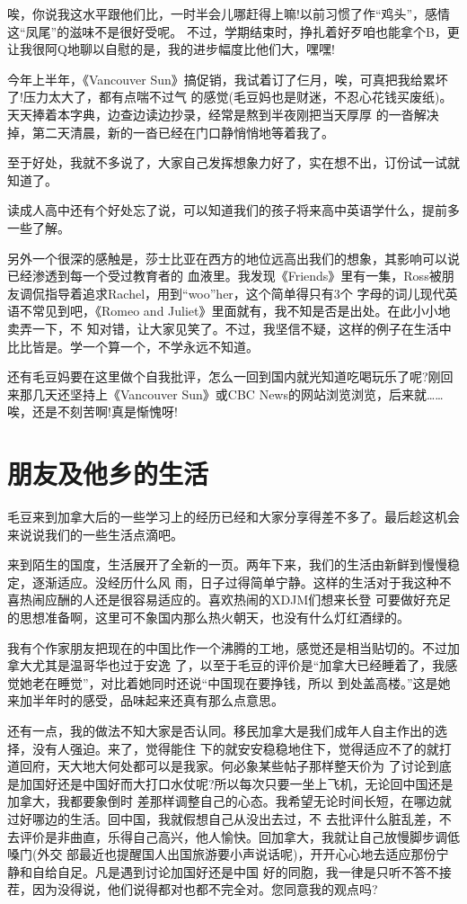 \documentclass[11pt,a4paper,onecolumn]{article}
\begin{document}
唉，你说我这水平跟他们比，一时半会儿哪赶得上嘛!以前习惯了作``鸡头''，感情这``凤尾''的滋味不是很好受呢。
不过，学期结束时，挣扎着好歹咱也能拿个B，更让我很阿Q地聊以自慰的是，我的进步幅度比他们大，嘿嘿!


今年上半年，《Vancouver Sun》搞促销，我试着订了仨月，唉，可真把我给累坏了!压力太大了，都有点喘不过气
的感觉(毛豆妈也是财迷，不忍心花钱买废纸)。天天捧着本字典，边查边读边抄录，经常是熬到半夜刚把当天厚厚
的一沓解决掉，第二天清晨，新的一沓已经在门口静悄悄地等着我了。


至于好处，我就不多说了，大家自己发挥想象力好了，实在想不出，订份试一试就知道了。


读成人高中还有个好处忘了说，可以知道我们的孩子将来高中英语学什么，提前多一些了解。


另外一个很深的感触是，莎士比亚在西方的地位远高出我们的想象，其影响可以说已经渗透到每一个受过教育者的
血液里。我发现《Friends》里有一集，Ross被朋友调侃指导着追求Rachel，用到``woo''her，这个简单得只有3个
字母的词儿现代英语不常见到吧，《Romeo and Juliet》里面就有，我不知是否是出处。在此小小地卖弄一下，不
知对错，让大家见笑了。不过，我坚信不疑，这样的例子在生活中比比皆是。学一个算一个，不学永远不知道。


还有毛豆妈要在这里做个自我批评，怎么一回到国内就光知道吃喝玩乐了呢?刚回来那几天还坚持上《Vancouver
Sun》或CBC News的网站浏览浏览，后来就\ldots\ldots 唉，还是不刻苦啊!真是惭愧呀!

\section{朋友及他乡的生活}


毛豆来到加拿大后的一些学习上的经历已经和大家分享得差不多了。最后趁这机会来说说我们的一些生活点滴吧。


来到陌生的国度，生活展开了全新的一页。两年下来，我们的生活由新鲜到慢慢稳定，逐渐适应。没经历什么风
雨，日子过得简单宁静。这样的生活对于我这种不喜热闹应酬的人还是很容易适应的。喜欢热闹的XDJM们想来长登
可要做好充足的思想准备啊，这里可不象国内那么热火朝天，也没有什么灯红酒绿的。


我有个作家朋友把现在的中国比作一个沸腾的工地，感觉还是相当贴切的。不过加拿大尤其是温哥华也过于安逸
了，以至于毛豆的评价是``加拿大已经睡着了，我感觉她老在睡觉''，对比着她同时还说``中国现在要挣钱，所以
到处盖高楼。''这是她来加半年时的感受，品味起来还真有那么点意思。


还有一点，我的做法不知大家是否认同。移民加拿大是我们成年人自主作出的选择，没有人强迫。来了，觉得能住
下的就安安稳稳地住下，觉得适应不了的就打道回府，天大地大何处都可以是我家。何必象某些帖子那样整天价为
了讨论到底是加国好还是中国好而大打口水仗呢?所以每次只要一坐上飞机，无论回中国还是加拿大，我都要象倒时
差那样调整自己的心态。我希望无论时间长短，在哪边就过好哪边的生活。回中国，我就假想自己从没出去过，不
去批评什么脏乱差，不去评价是非曲直，乐得自己高兴，他人愉快。回加拿大，我就让自己放慢脚步调低嗓门(外交
部最近也提醒国人出国旅游要小声说话呢)，开开心心地去适应那份宁静和自给自足。凡是遇到讨论加国好还是中国
好的同胞，我一律是只听不答不接茬，因为没得说，他们说得都对也都不完全对。您同意我的观点吗?
\end{document}
